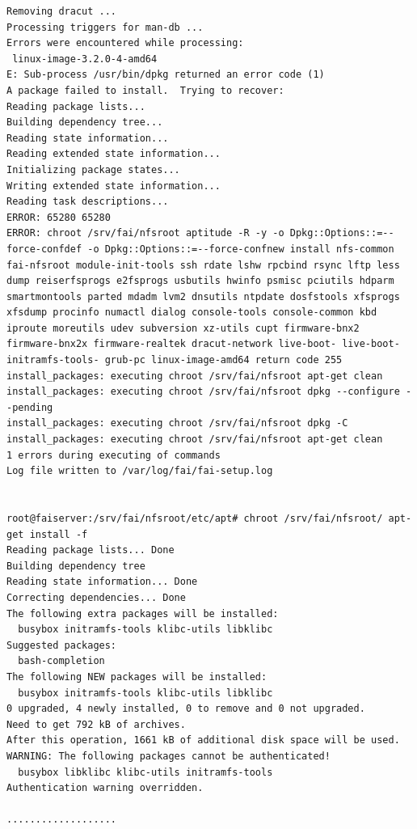 \documentclass[11pt
  , a4paper
  , article
  , oneside
]{memoir}
\begin{document}
\begin{lstlisting}
Removing dracut ...
Processing triggers for man-db ...
Errors were encountered while processing:
 linux-image-3.2.0-4-amd64
E: Sub-process /usr/bin/dpkg returned an error code (1)
A package failed to install.  Trying to recover:
Reading package lists...
Building dependency tree...
Reading state information...
Reading extended state information...
Initializing package states...
Writing extended state information...
Reading task descriptions...
ERROR: 65280 65280
ERROR: chroot /srv/fai/nfsroot aptitude -R -y -o Dpkg::Options::=--force-confdef -o Dpkg::Options::=--force-confnew install nfs-common fai-nfsroot module-init-tools ssh rdate lshw rpcbind rsync lftp less dump reiserfsprogs e2fsprogs usbutils hwinfo psmisc pciutils hdparm smartmontools parted mdadm lvm2 dnsutils ntpdate dosfstools xfsprogs xfsdump procinfo numactl dialog console-tools console-common kbd iproute moreutils udev subversion xz-utils cupt firmware-bnx2 firmware-bnx2x firmware-realtek dracut-network live-boot- live-boot-initramfs-tools- grub-pc linux-image-amd64 return code 255
install_packages: executing chroot /srv/fai/nfsroot apt-get clean
install_packages: executing chroot /srv/fai/nfsroot dpkg --configure --pending
install_packages: executing chroot /srv/fai/nfsroot dpkg -C
install_packages: executing chroot /srv/fai/nfsroot apt-get clean
1 errors during executing of commands
Log file written to /var/log/fai/fai-setup.log


root@faiserver:/srv/fai/nfsroot/etc/apt# chroot /srv/fai/nfsroot/ apt-get install -f
Reading package lists... Done
Building dependency tree       
Reading state information... Done
Correcting dependencies... Done
The following extra packages will be installed:
  busybox initramfs-tools klibc-utils libklibc
Suggested packages:
  bash-completion
The following NEW packages will be installed:
  busybox initramfs-tools klibc-utils libklibc
0 upgraded, 4 newly installed, 0 to remove and 0 not upgraded.
Need to get 792 kB of archives.
After this operation, 1661 kB of additional disk space will be used.
WARNING: The following packages cannot be authenticated!
  busybox libklibc klibc-utils initramfs-tools
Authentication warning overridden.

...................


\end{lstlisting}
\end{document}
